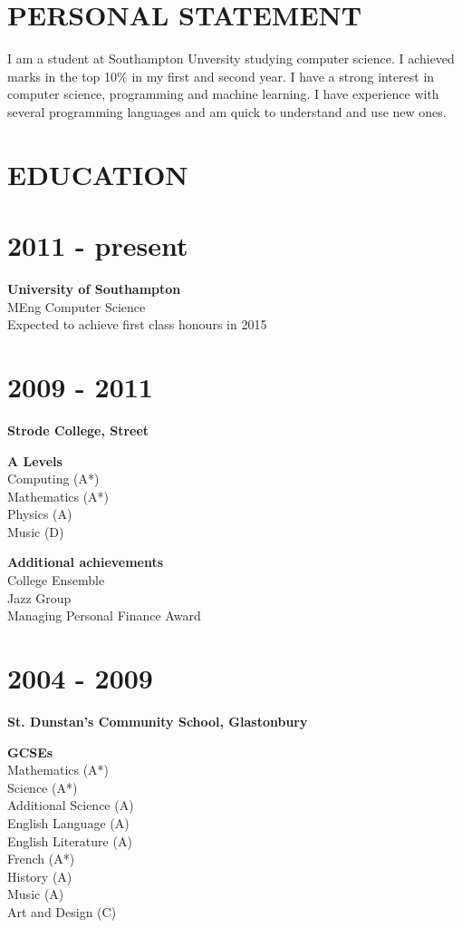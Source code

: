 \documentclass[margin]{res}
\begin{document}
\begin{resume}

\section{PERSONAL STATEMENT}
I am a student at Southampton Unversity studying computer science. I
achieved marks in the top 10\% in my first and second year. I have a strong
interest in computer science, programming and machine learning. I have
experience with  several programming languages and am quick to understand
and use new ones.

\section{EDUCATION}
\normalsize{\section{2011 - present}}
{\bf University of Southampton} \\
MEng Computer Science \\
Expected to achieve first class honours in 2015
\normalsize{\section{2009 - 2011}}
{\bf Strode College, Street}

{\bf A Levels} \\
Computing (A*) \\
Mathematics (A*) \\
Physics (A) \\
Music (D)

{\bf Additional achievements} \\
College Ensemble \\
Jazz Group \\
Managing Personal Finance Award

\normalsize{\section{2004 - 2009}}
{\bf St. Dunstan's Community School, Glastonbury}

{\bf GCSEs} \\
Mathematics (A*) \\
Science (A*) \\
Additional Science (A) \\
English Language (A) \\
English Literature (A) \\
French (A*) \\
History (A) \\
Music (A) \\
Art and Design (C)


\end{resume}
\end{document}
